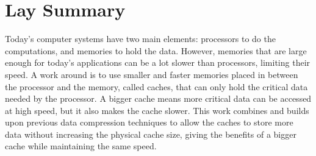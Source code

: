 
\chapter{Lay Summary}
Today's computer systems have two main elements: processors to do the computations, and memories to hold the data. However, memories that are large enough for today's applications can be a lot slower than processors, limiting their speed. A work around is to use smaller and faster memories placed in between the processor and the memory, called caches, that can only hold the critical data needed by the processor. A bigger cache means more critical data can be accessed at high speed, but it also makes the cache slower. This work combines and builds upon previous data compression techniques to allow the caches to store more data without increasing the physical cache size, giving the benefits of a bigger cache while maintaining the same speed.